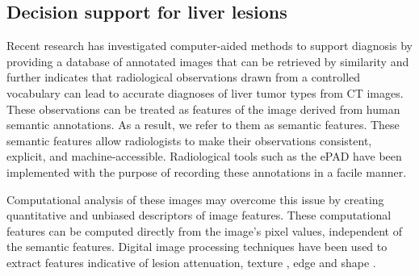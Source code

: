\subsection{Decision support for liver lesions}
Recent research has investigated computer-aided methods to support diagnosis by providing a database of annotated images that can be retrieved by similarity\cite{Napel:2010es} and further indicates that radiological observations drawn from a controlled vocabulary can lead to accurate diagnoses of liver tumor types from CT images\cite{Korenblum:2011gx}. These observations can be treated as features of the image derived from human semantic annotations. As a result, we refer to them as semantic features. These semantic features allow radiologists to make their observations consistent, explicit, and machine-accessible. Radiological tools such as the ePAD \cite{Rubin:2008uz} have been implemented with the purpose of recording these annotations in a facile manner.

Computational analysis of these images may overcome this issue by creating quantitative and unbiased descriptors of image features. These computational features can be computed directly from the image's pixel values, independent of the semantic features. Digital image processing techniques have been used to extract features indicative of lesion attenuation, texture \cite{Strela:2002vq,Zhao:2005wb}, edge and shape \cite{Hong:2006ti,Manay:2006un,MRangayyan:2005td,Xu:2012bh}.